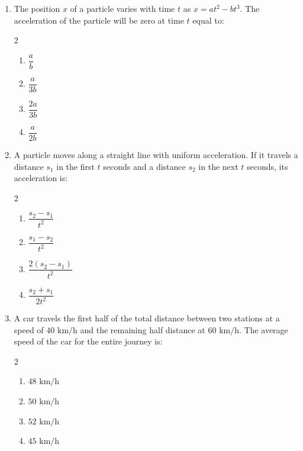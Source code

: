 \documentclass[11pt,a4paper]{article}
\begin{document}
\begin{enumerate}[label=\textbf{\textcolor{l1Green}{Q\arabic*.}},leftmargin=24pt,itemsep=10pt]
  \item The position $x$ of a particle varies with time $t$ as $x = at^2 - bt^3$. The acceleration of the particle will be zero at time $t$ equal to:
  \begin{multicols}{2}
  \begin{enumerate}[label=\textbf{\textcolor{primaryDark}{(\Alph*)}},itemsep=2pt]
    \item $\dfrac{a}{b}$
    \item $\dfrac{a}{3b}$
    \item $\dfrac{2a}{3b}$
    \item $\dfrac{a}{2b}$
  \end{enumerate}
  \end{multicols}

  \item A particle moves along a straight line with uniform acceleration. If it travels a distance $s_1$ in the first $t$ seconds and a distance $s_2$ in the next $t$ seconds, its acceleration is:
  \begin{multicols}{2}
  \begin{enumerate}[label=\textbf{\textcolor{primaryDark}{(\Alph*)}},itemsep=2pt]
    \item $\dfrac{s_2 - s_1}{t^2}$
    \item $\dfrac{s_1 - s_2}{t^2}$
    \item $\dfrac{2(s_2 - s_1)}{t^2}$
    \item $\dfrac{s_2 + s_1}{2t^2}$
  \end{enumerate}
  \end{multicols}

  \item A car travels the first half of the total distance between two stations at a speed of $40\text{ km/h}$ and the remaining half distance at $60\text{ km/h}$. The average speed of the car for the entire journey is:
  \begin{multicols}{2}
  \begin{enumerate}[label=\textbf{\textcolor{primaryDark}{(\Alph*)}},itemsep=2pt]
    \item $48\text{ km/h}$
    \item $50\text{ km/h}$
    \item $52\text{ km/h}$
    \item $45\text{ km/h}$
  \end{enumerate}
  \end{multicols}


\end{enumerate}
\end{document}
